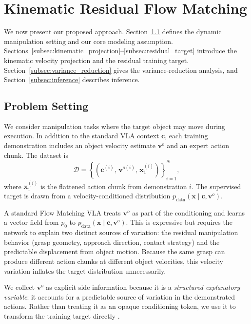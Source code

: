 \documentclass[10pt,twocolumn,letterpaper]{article}
\begin{document}
\section{Kinematic Residual Flow Matching}
\label{sec:method}

We now present our proposed approach. Section~\ref{subsec:problem_setting} defines the
dynamic manipulation setting and our core modeling assumption.
Sections~\ref{subsec:kinematic_projection}--\ref{subsec:residual_target}
introduce the kinematic velocity projection and the residual training target.
Section~\ref{subsec:variance_reduction} gives the variance-reduction analysis,
and Section~\ref{subsec:inference} describes inference.

\subsection{Problem Setting}
\label{subsec:problem_setting}

We consider manipulation tasks where the target object may move during
execution. In addition to the standard VLA context $\mathbf c$, each training
demonstration includes an object velocity estimate $\mathbf v^{o}$ and an
expert action chunk. The dataset is
\[
    \mathcal D = \left\{
        \left(\mathbf c^{(i)},\, \mathbf v^{o(i)},\, \mathbf x_1^{(i)}\right)
    \right\}_{i=1}^N,
\]
where $\mathbf x_1^{(i)}$ is the flattened action chunk from demonstration $i$.
The supervised target is drawn from a velocity-conditioned distribution
$p_{\mathrm{data}}(\mathbf x \mid \mathbf c, \mathbf v^{o})$.

A standard Flow Matching VLA treats $\mathbf v^{o}$ as part of the conditioning
and learns a vector field from $p_0$ to
$p_{\mathrm{data}}(\mathbf x \mid \mathbf c, \mathbf v^{o})$. This is
expressive but requires the network to explain two distinct sources of
variation: the residual manipulation behavior (grasp geometry, approach
direction, contact strategy) and the predictable displacement from object
motion. Because the same grasp can produce different action chunks at different
object velocities, this velocity variation inflates the target distribution
unnecessarily.

We collect $\mathbf v^{o}$ as explicit side information because it is a
\emph{structured explanatory variable}: it accounts for a predictable source of
variation in the demonstrated actions. Rather than treating it as an opaque
conditioning token, we use it to transform the training target directly
\citep{vapnik2009lupi,chen2020learningbycheating}.
\end{document}
